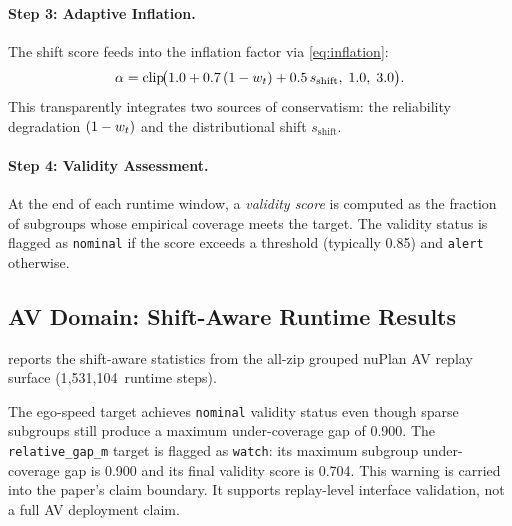 \paragraph{Step 3: Adaptive Inflation.}
The shift score feeds into the inflation factor via \cref{eq:inflation}:
\[
  \alpha = \mathrm{clip}\!\bigl(1.0 + 0.7\,(1-w_t) + 0.5\,s_{\mathrm{shift}},\; 1.0,\; 3.0\bigr).
\]
This transparently integrates two sources of conservatism: the reliability
degradation $(1-w_t)$ and the distributional shift $s_{\mathrm{shift}}$.

\paragraph{Step 4: Validity Assessment.}
At the end of each runtime window, a \emph{validity score} is computed as the
fraction of subgroups whose empirical coverage meets the target.  The validity
status is flagged as \texttt{nominal} if the score exceeds a threshold (typically
0.85) and \texttt{alert} otherwise.

\subsection{AV Domain: Shift-Aware Runtime Results}

 reports the shift-aware statistics from the all-zip
grouped nuPlan AV replay surface (1{,}531{,}104~runtime steps).

\begin{table}[h]
\caption{Shift-aware runtime statistics for the all-zip grouped nuPlan AV row.}
\label{tab:shift_aware_av}
\centering\small
{}
\end{table}

The ego-speed target achieves \texttt{nominal} validity status even though sparse
subgroups still produce a maximum under-coverage gap of 0.900.  The
\texttt{relative\_gap\_m} target is flagged as \texttt{watch}: its maximum subgroup
under-coverage gap is 0.900 and its final validity score is 0.704.  This warning is
carried into the paper's claim boundary.  It supports replay-level interface
validation, not a full AV deployment claim.

